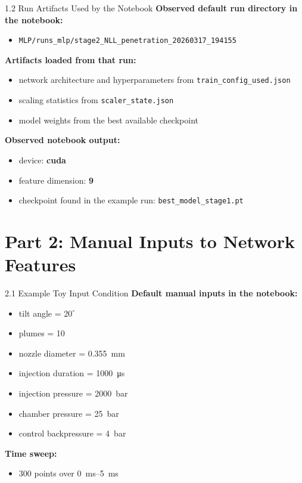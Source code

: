 \documentclass[UTF8,aspectratio=169]{ctexbeamer}
\begin{document}
\begin{frame}{1.2 Run Artifacts Used by the Notebook}
\textbf{Observed default run directory in the notebook:}
\begin{itemize}
  \item \texttt{MLP/runs\_mlp/stage2\_NLL\_penetration\_20260317\_194155}
\end{itemize}

\vspace{0.3em}
\textbf{Artifacts loaded from that run:}
\begin{itemize}
  \item network architecture and hyperparameters from \texttt{train\_config\_used.json}
  \item scaling statistics from \texttt{scaler\_state.json}
  \item model weights from the best available checkpoint
\end{itemize}

\vspace{0.3em}
\textbf{Observed notebook output:}
\begin{itemize}
  \item device: \textbf{cuda}
  \item feature dimension: \textbf{9}
  \item checkpoint found in the example run: \texttt{best\_model\_stage1.pt}
\end{itemize}
\end{frame}

\section{Part 2: Manual Inputs to Network Features}

\begin{frame}{2.1 Example Toy Input Condition}
\textbf{Default manual inputs in the notebook:}
\begin{itemize}
  \item tilt angle = $20^\circ$
  \item plumes = 10
  \item nozzle diameter = \SI{0.355}{mm}
  \item injection duration = \SI{1000}{\micro\second}
  \item injection pressure = \SI{2000}{bar}
  \item chamber pressure = \SI{25}{bar}
  \item control backpressure = \SI{4}{bar}
\end{itemize}

\vspace{0.3em}
\textbf{Time sweep:}
\begin{itemize}
  \item \num{300} points over \SIrange{0}{5}{ms}
\end{itemize}
\end{frame}
\end{document}
